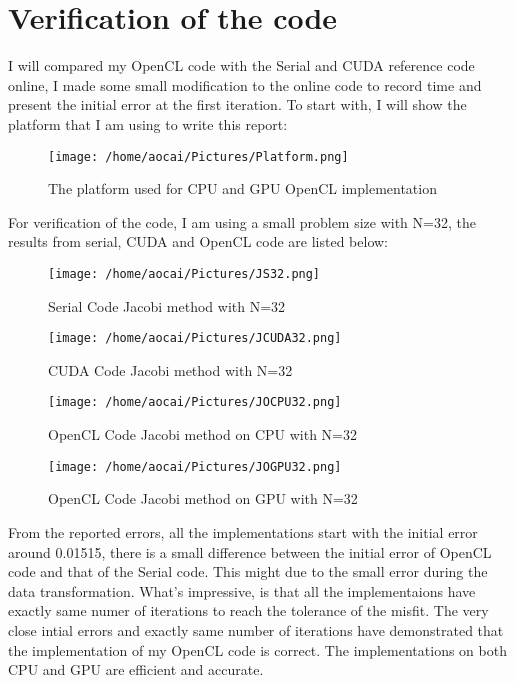 \documentclass[12pt]{article}
\begin{document}
\section{Verification of the code}
I will compared my OpenCL code with the Serial and CUDA reference code online, I made some small modification to the online code to record time and present the initial error at the first iteration. To start with, I will show the platform that I am using to write this report:
\begin{figure}[H]
	\centering
	\texttt{[image: /home/aocai/Pictures/Platform.png]}
	\caption[Optional caption]{The platform used for CPU and GPU OpenCL implementation}
	\label{fig:Platform}
\end{figure} 
For verification of the code, I am using a small problem size with N=32, the results from serial, CUDA and OpenCL code are listed below:
\begin{figure}[H]
	\centering
	\texttt{[image: /home/aocai/Pictures/JS32.png]}
	\caption[Optional caption]{Serial Code Jacobi method with N=32}
	\label{fig:JS32}
\end{figure} 
\begin{figure}[H]
	\centering
	\texttt{[image: /home/aocai/Pictures/JCUDA32.png]}
	\caption[Optional caption]{CUDA Code Jacobi method with N=32}
	\label{fig:JCUDA32}
\end{figure} 
\begin{figure}[H]
	\centering
	\texttt{[image: /home/aocai/Pictures/JOCPU32.png]}
	\caption[Optional caption]{OpenCL Code Jacobi method on CPU with N=32}
	\label{fig:JOCPU32}
\end{figure}
\begin{figure}[H]
	\centering
	\texttt{[image: /home/aocai/Pictures/JOGPU32.png]}
	\caption[Optional caption]{OpenCL Code Jacobi method on GPU with N=32}
	\label{fig:JOGPU32}
\end{figure}

From the reported errors, all the implementations start with the initial error around 0.01515, there is a small difference between the initial error of OpenCL code and that of the Serial code. This might due to the small error during the data transformation. What's impressive, is that all the implementaions have exactly same numer of iterations to reach the tolerance of the misfit. The very close intial errors and exactly same number of iterations have demonstrated that the implementation of my OpenCL code is correct. The implementations on both CPU and GPU are efficient and accurate.
\end{document}
